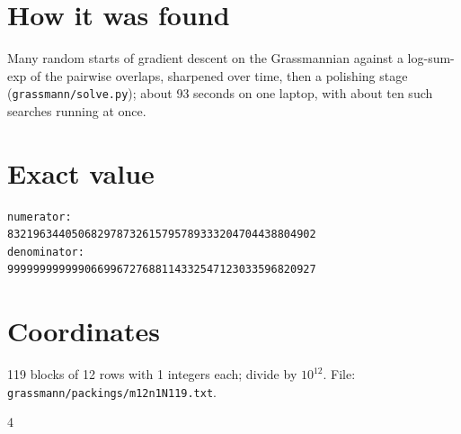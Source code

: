 \documentclass[11pt,a4paper]{article}
\begin{document}
\section{How it was found}
Many random starts of gradient descent on the Grassmannian against a log-sum-exp of the pairwise overlaps, sharpened over time, then a polishing stage (\texttt{grassmann/solve.py}); about 93 seconds on one laptop, with about ten such searches running at once.


\appendix
\section{Exact value}
{\small
\begin{verbatim}
numerator:
832196344050682978732615795789333204704438804902
denominator:
999999999999066996727688114332547123033596820927
\end{verbatim}}

\section{Coordinates}
119 blocks of 12 rows with 1 integers each; divide by $10^{12}$. File: \texttt{grassmann/packings/m12n1N119.txt}.
{\tiny
\begin{multicols}{4}
\end{multicols}}
\end{document}
